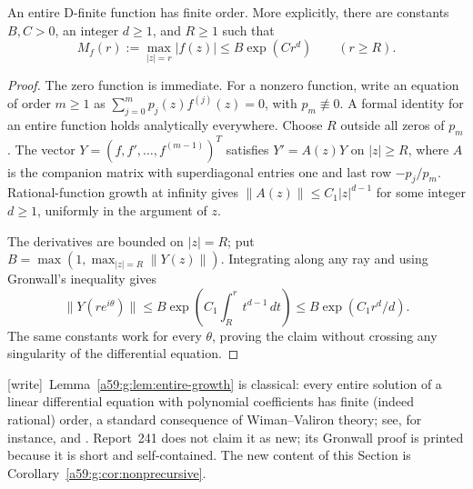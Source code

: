 \documentclass[11pt,letterpaper]{article}
\theoremstyle{remark}\newtheorem{remark}[theorem]{Remark}
\newcommand{\wtag}{\textup{[write]}}
\theoremstyle{remark}\newtheorem{wremark}{Remark}\renewcommand{\thewremark}{W\arabic{wremark}}
\theoremstyle{plain}\newtheorem{wcorollary}[wremark]{Corollary}
\begin{document}
\begin{lemma}\label{a59:g:lem:entire-growth}
An entire D-finite function has finite order. More explicitly, there are constants $B,C>0$, an integer $d\geq1$, and $R\geq1$ such that
\[
 M_f(r):=\max_{|z|=r}|f(z)|\leq B\exp(Cr^d)\qquad(r\geq R).
\]
\end{lemma}
\begin{proof}
The zero function is immediate. For a nonzero function, write an equation of order $m\geq1$ as $\sum_{j=0}^m p_j(z)f^{(j)}(z)=0$, with $p_m\not\equiv0$. A formal identity for an entire function holds analytically everywhere. Choose $R$ outside all zeros of $p_m$. The vector $Y=(f,f',\ldots,f^{(m-1)})^T$ satisfies $Y'=A(z)Y$ on $|z|\geq R$, where $A$ is the companion matrix with superdiagonal entries one and last row $-p_j/p_m$. Rational-function growth at infinity gives
$\|A(z)\|\leq C_1|z|^{d-1}$ for some integer $d\geq1$, uniformly in the argument of $z$.

The derivatives are bounded on $|z|=R$; put $B=\max(1,\max_{|z|=R}\|Y(z)\|)$. Integrating along any ray and using Gronwall's inequality gives
\[
 \|Y(re^{i\theta})\|\leq
 B\exp\left(C_1\int_R^r t^{d-1}\,dt\right)
 \leq B\exp(C_1r^d/d).
\]
The same constants work for every $\theta$, proving the claim without crossing any singularity of the differential equation.
\end{proof}
\noindent\wtag\ Lemma~\ref{a59:g:lem:entire-growth} is classical: every entire
solution of a linear differential equation with polynomial coefficients has
finite (indeed rational) order, a standard consequence of Wiman--Valiron
theory; see, for instance, \cite{laine} and \cite{gsw}. Report~241 does not
claim it as new; its Gronwall proof is printed because it is short and
self-contained. The new content of this Section is
Corollary~\ref{a59:g:cor:nonprecursive}.
\end{document}
